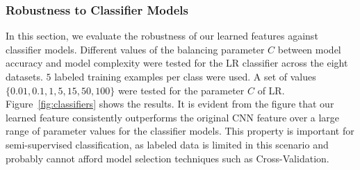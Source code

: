 \documentclass[preprint,12pt,3p]{elsarticle}
\begin{document}



\subsubsection{Robustness to Classifier Models}
In this section, we evaluate the robustness of our learned features
against classifier models. Different values of the balancing parameter
$C$ between model accuracy and model complexity were tested for the LR
classifier across the eight datasets.  $5$ labeled training examples
per class were used.  A set of values $\{0.01, 0.1, 1, 5, 15, 50,
100\}$ were tested for the parameter $C$ of LR. Figure~\ref{fig:classifiers}
shows the results. It is evident from the figure that our learned
feature consistently outperforms the original CNN feature over a large
range of parameter values for the classifier models. This property is
important for semi-supervised classification, as labeled data is
limited in this scenario and probably cannot afford model selection
techniques such as Cross-Validation.
\end{document}
